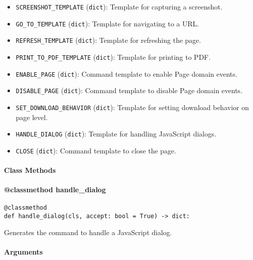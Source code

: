 \documentclass{article}
\begin{document}
\begin{itemize}
    \item \lstinline[style=pythonstyle]|SCREENSHOT_TEMPLATE| (\lstinline[style=pythonstyle]|dict|): Template for capturing a screenshot.
    \item \lstinline[style=pythonstyle]|GO_TO_TEMPLATE| (\lstinline[style=pythonstyle]|dict|): Template for navigating to a URL.
    \item \lstinline[style=pythonstyle]|REFRESH_TEMPLATE| (\lstinline[style=pythonstyle]|dict|): Template for refreshing the page.
    \item \lstinline[style=pythonstyle]|PRINT_TO_PDF_TEMPLATE| (\lstinline[style=pythonstyle]|dict|): Template for printing to PDF.
    \item \lstinline[style=pythonstyle]|ENABLE_PAGE| (\lstinline[style=pythonstyle]|dict|): Command template to enable Page domain events.
    \item \lstinline[style=pythonstyle]|DISABLE_PAGE| (\lstinline[style=pythonstyle]|dict|): Command template to disable Page domain events.
    \item \lstinline[style=pythonstyle]|SET_DOWNLOAD_BEHAVIOR| (\lstinline[style=pythonstyle]|dict|): Template for setting download behavior on page level.
    \item \lstinline[style=pythonstyle]|HANDLE_DIALOG| (\lstinline[style=pythonstyle]|dict|): Template for handling JavaScript dialogs.
    \item \lstinline[style=pythonstyle]|CLOSE| (\lstinline[style=pythonstyle]|dict|): Command template to close the page.
\end{itemize}

\paragraph{Class Methods}
\paragraph{@classmethod handle\_dialog}

\begin{lstlisting}[style=pythonstyle]
@classmethod
def handle_dialog(cls, accept: bool = True) -> dict:
\end{lstlisting}

\noindent Generates the command to handle a JavaScript dialog.

\paragraph{Arguments}
\end{document}

